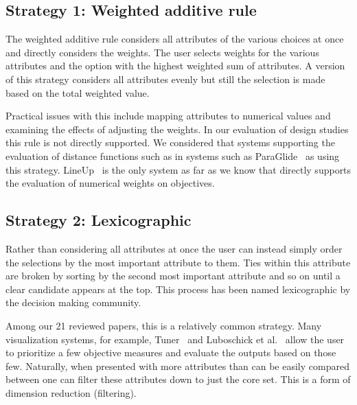 



\subsection{Strategy 1: Weighted additive rule}\label{weighted-additive-rule}

The weighted additive rule considers all
attributes of the various choices at once and directly considers 
the weights. The user selects weights for the various attributes and 
the option with the highest weighted sum of attributes.
A version of this strategy considers all attributes evenly but still
the selection is made based on the total weighted value.

Practical issues with this include mapping attributes to numerical values
and examining the effects of adjusting the weights. In our evaluation of
design studies this rule is not directly supported. We considered that
systems supporting the evaluation of distance functions such as 
in systems such as ParaGlide~\citep{Bergner:2013} as using this strategy.
LineUp~\citep{Gratzl:2013} is the only system as far as we know that
directly supports the evaluation of numerical weights on objectives. 

\subsection{Strategy 2: Lexicographic}\label{lexicographic}

Rather than considering all attributes at once the user can instead simply
order the selections by the most important attribute to them. Ties within this
attribute are broken by sorting by the second most important attribute and so
on until a clear candidate appears at the top. This process has been named
lexicographic by the decision making community.

Among our 21 reviewed papers, this is a relatively common strategy.
Many visualization systems, for example, Tuner~\cite{Torsney-Weir:2011} and
Luboschick et al.~\citep{Luboschik:2014} allow the user to prioritize a few
objective measures and evaluate the outputs based on those few. Naturally,
when presented with more attributes than can be easily compared between
one can filter
these attributes down to just the core set. This is a form of dimension 
reduction (filtering).

